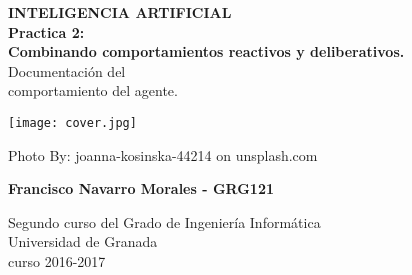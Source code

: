 \documentclass[a4paper, 11pt]{article}
\begin{document}
	
	
	\begin{titlepage}
		\begin{center}

			
			{\Huge \textbf{INTELIGENCIA ARTIFICIAL \\Practica 2: \\
					Combinando comportamientos	reactivos y deliberativos.}\\
			Documentación del \\ comportamiento del agente.	}
			    \vspace{1cm}
			
			
		    \centering\texttt{[image: cover.jpg]}
		
		    {\footnotesize Photo By: joanna-kosinska-44214 on unsplash.com } 
			\vspace{1cm}
			
			\textbf{Francisco Navarro Morales - GRG121 }
			
			Segundo curso del Grado de Ingeniería Informática\\
			Universidad de Granada\\
			curso 2016-2017\\
			
		\end{center}
	\end{titlepage}



\renewcommand{\abstractname}{Resumen} %





\pagebreak
\end{document}
